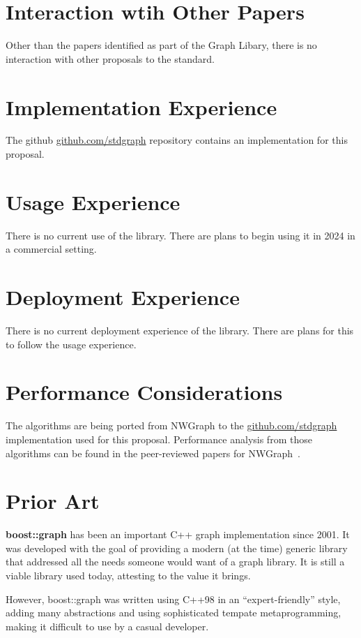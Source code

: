 \section{Interaction wtih Other Papers}
Other than the papers identified as part of the Graph Libary, there is no interaction with other proposals to the standard.

\section{Implementation Experience}
The github \href{https://github.com/stdgraph}{github.com/stdgraph} repository contains an implementation for this proposal.

\section{Usage Experience}
There is no current use of the library. There are plans to begin using it in 2024 in a commercial setting.

\section{Deployment Experience}
There is no current deployment experience of the library. There are plans for this to follow the usage experience.

\section{Performance Considerations}
The algorithms are being ported from NWGraph to the \href{https://github.com/stdgraph}{github.com/stdgraph} implementation used for this proposal. 
Performance analysis from those algorithms can be found in the peer-reviewed papers for NWGraph~\cite{REF_nwgraph_paper,gapbs_2023}.

\section{Prior Art}
\textbf{boost::graph} has been an important C++ graph implementation since 2001. It was developed with the goal of providing
a modern (at the time) generic library that addressed all the needs someone would want of a graph library. It is still a viable library used today, attesting to the value it brings.

However, boost::graph was written using C++98 in an ``expert-friendly'' style, adding many abstractions and using sophisticated tempate metaprogramming, making it difficult to use by a casual developer.


